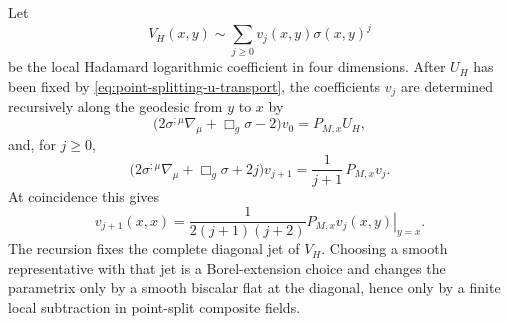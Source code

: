 \begin{proposition}
\label{prop:hadamard-logarithmic-recursion}
Let
\[
  V_H(x,y)\sim\sum_{j\ge0}v_j(x,y)\sigma(x,y)^j
\]
be the local Hadamard logarithmic coefficient in four dimensions.  After
\(U_H\) has been fixed by
\eqref{eq:point-splitting-u-transport}, the coefficients \(v_j\) are
determined recursively along the geodesic from \(y\) to \(x\) by
\begin{equation}
  \bigl(2\sigma^{;\mu}\nabla_\mu+\Box_g\sigma-2\bigr)v_0
  =
  P_{M,x}U_H,
  \label{eq:hadamard-recursion-v0}
\end{equation}
and, for \(j\ge0\),
\begin{equation}
  \bigl(2\sigma^{;\mu}\nabla_\mu+\Box_g\sigma+2j\bigr)v_{j+1}
  =
  \frac{1}{j+1}\,P_{M,x}v_j .
  \label{eq:hadamard-recursion-vj}
\end{equation}
At coincidence this gives
\begin{equation}
  v_{j+1}(x,x)
  =
  \frac{1}{2(j+1)(j+2)}
  \left.P_{M,x}v_j(x,y)\right|_{y=x}.
  \label{eq:hadamard-recursion-coincidence}
\end{equation}
The recursion fixes the complete diagonal jet of \(V_H\).  Choosing a smooth
representative with that jet is a Borel-extension choice and changes the
parametrix only by a smooth biscalar flat at the diagonal, hence only by a
finite local subtraction in point-split composite fields.
\end{proposition}

